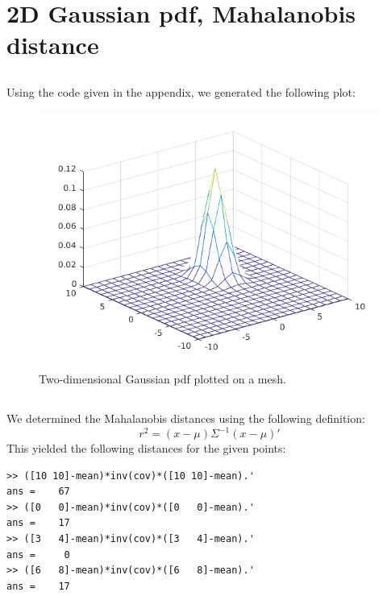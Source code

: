 \documentclass[10pt]{article}
\begin{document}
\section{2D Gaussian pdf, Mahalanobis distance}
\subsection{}
Using the code given in the appendix, we generated the following plot:
\begin{figure}[H]
 \centering
 \includegraphics[width=.7\textwidth]{Ass31.png}
 \caption{Two-dimensional Gaussian pdf plotted on a mesh.}
 \label{31}
\end{figure}

\subsection{}
We determined the Mahalanobis distances using the following definition:
\begin{equation}
r^2=(x-\mu)\Sigma^{-1}(x-\mu)'
\end{equation}
This yielded the following distances for the given points:
\begin{lstlisting}
>> ([10 10]-mean)*inv(cov)*([10 10]-mean).'
ans =    67
>> ([0   0]-mean)*inv(cov)*([0   0]-mean).'
ans =    17
>> ([3   4]-mean)*inv(cov)*([3   4]-mean).'
ans =     0
>> ([6   8]-mean)*inv(cov)*([6   8]-mean).'
ans =    17
\end{lstlisting}
\end{document}
